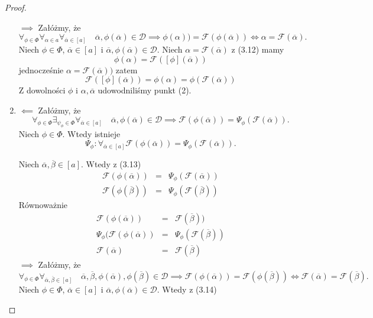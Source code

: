 \documentclass[12pt,a4paper]{report}
\newcommand{\domkniecie}[1]{\left\lbrack{#1}\right\rbrack}
\begin{document}
\begin{proof}
\begin{enumerate}
$\implies$
Załóżmy, że
\begin{equation}
\forall_{\phi \in \Phi}\forall_{\alpha \in a}\forall_{\overline{\alpha} \in \domkniecie{a}} \quad \overline{\alpha}, \phi(\overline{\alpha}) \in \mathcal{D} \implies \phi(\alpha))=\mathcal{F}(\phi(\overline{\alpha})) \iff \alpha=\mathcal{F}(\overline{\alpha}).
\end{equation}
Niech $\phi \in \Phi$, $\overline{\alpha} \in \domkniecie{a}$ i $\overline{\alpha}, \phi(\overline{\alpha}) \in \mathcal{D}$. Niech $\alpha=\mathcal{F}(\overline{\alpha})$ z (3.12) mamy 
$$
\phi(\alpha)=\mathcal{F}(\domkniecie{\phi}(\overline{\alpha}))
$$
 jednocześnie $\alpha=\mathcal{F}(\overline{\alpha}))$ zatem
$$
\mathcal{F}(\domkniecie{\phi}(\overline{\alpha}))=\phi(\alpha)=\phi(\mathcal{F}(\overline{\alpha}))
$$
Z dowolności $\phi$ i $\alpha, \overline{\alpha}$ udowodniliśmy punkt (2).
\item
$\impliedby$
Załóżmy, że
\begin{equation*}
\forall_{\phi \in \Phi}  \exists_{\psi_{\phi}\in \Phi} \forall_{\overline{\alpha} \in \domkniecie{a}} \quad \overline{\alpha}, \phi(\overline{\alpha}) \in \mathcal{D} \implies \mathcal{F}(\phi(\overline{\alpha}))=\Psi_{\phi}(\mathcal{F}(\overline{\alpha})).
\end{equation*}
Niech $\phi \in \Phi$. Wtedy istnieje 
\begin{equation}
\Psi_{\phi}: \forall_{\overline{\alpha} \in \domkniecie{a}} \mathcal{F}(\phi(\overline{\alpha}))=\Psi_{\phi}(\mathcal{F}(\overline{\alpha})).
\end{equation}

Niech $\overline{\alpha}, \overline{\beta} \in \domkniecie{a}$. Wtedy z (3.13)
\begin{eqnarray*}
\mathcal{F}(\phi(\overline{\alpha}))&=&\Psi_{\phi}(\mathcal{F}(\overline{\alpha}))\\
\mathcal{F}(\phi(\overline{\beta}))&=&\Psi_{\phi}(\mathcal{F}(\overline{\beta}))
\end{eqnarray*}
Równoważnie
\begin{eqnarray*}
\mathcal{F}(\phi(\overline{\alpha}))&=&\mathcal{F}(\overline{\beta}))\\
\Psi_{\phi}(\mathcal{F}(\phi(\overline{\alpha}))&=&\Psi_{\phi}(\mathcal{F}(\overline{\beta}))\\
\mathcal{F}(\overline{\alpha})&=&\mathcal{F}(\overline{\beta})
\end{eqnarray*}
$\implies$
Załóżmy, że
\begin{equation}
\forall_{\phi \in \Phi} \forall_{\overline{\alpha}, \overline{\beta} \in \domkniecie{a}}  \quad \overline{\alpha}, \overline{\beta}, \phi(\overline{\alpha}), \phi(\overline{\beta}) \in \mathcal{D} \implies  \mathcal{F}(\phi(\overline{\alpha}))=\mathcal{F}(\phi(\overline{\beta})) \iff \mathcal{F}(\overline{\alpha})=\mathcal{F}(\overline{\beta}).
\end{equation}
Niech $\phi \in \Phi$, $\overline{\alpha} \in \domkniecie{a}$ i $\overline{\alpha}, \phi(\overline{\alpha}) \in \mathcal{D}$. Wtedy z (3.14)
\end{enumerate}
\end{proof}
\end{document}
